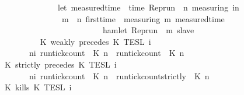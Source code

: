 \begin{isabellebody}
\ \ \ \ \ \ \ \ \ \ \ \ \ \ \ \ \ {\isacharparenleft}let\ measured{\isacharunderscore}time\ {\isacharequal}\ time\ {\isacharparenleft}{\isacharparenleft}Rep{\isacharunderscore}run\ {\isasymrho}{\isacharparenright}\ n\ measuring{\isacharparenright}\ in\isanewline
\ \ \ \ \ \ \ \ \ \ \ \ \ \ \ \ \ \ {\isasymforall}m\ {\isasymge}\ n{\isachardot}\ first{\isacharunderscore}time\ {\isasymrho}\ measuring\ m\ {\isacharparenleft}measured{\isacharunderscore}time\ {\isacharplus}\ {\isasymdelta}{\isasymtau}{\isacharparenright}\isanewline
\ \ \ \ \ \ \ \ \ \ \ \ \ \ \ \ \ \ \ \ \ \ \ \ \ \ \ {\isasymlongrightarrow}\ hamlet\ {\isacharparenleft}{\isacharparenleft}Rep{\isacharunderscore}run\ {\isasymrho}{\isacharparenright}\ m\ slave{\isacharparenright}\isanewline
\ \ \ \ \ \ \ \ \ \ \ \ \ \ \ \ \ {\isacharparenright}\isanewline
\ \ \ \ \ \ \ \ {\isacharbraceright}{\isacartoucheclose}\isanewline
\ \ {\isacharbar}\ {\isacartoucheopen}{\isasymlbrakk}\ K\ weakly\ precedes\ K\ {\isasymrbrakk}\isactrlsub T\isactrlsub E\isactrlsub S\isactrlsub L\isactrlbsup {\isasymge}\ i\isactrlesup \ {\isacharequal}\isanewline
\ \ \ \ \ \ \ \ {\isacharbraceleft}\ {\isasymrho}{\isachardot}\ {\isasymforall}n{\isasymge}i{\isachardot}\ {\isacharparenleft}run{\isacharunderscore}tick{\isacharunderscore}count\ {\isasymrho}\ K\ n{\isacharparenright}\ {\isasymle}\ {\isacharparenleft}run{\isacharunderscore}tick{\isacharunderscore}count\ {\isasymrho}\ K\ n{\isacharparenright}\ {\isacharbraceright}{\isacartoucheclose}\isanewline
\ \ {\isacharbar}\ {\isacartoucheopen}{\isasymlbrakk}\ K\ strictly\ precedes\ K\ {\isasymrbrakk}\isactrlsub T\isactrlsub E\isactrlsub S\isactrlsub L\isactrlbsup {\isasymge}\ i\isactrlesup \ {\isacharequal}\isanewline
\ \ \ \ \ \ \ \ {\isacharbraceleft}\ {\isasymrho}{\isachardot}\ {\isasymforall}n{\isasymge}i{\isachardot}\ {\isacharparenleft}run{\isacharunderscore}tick{\isacharunderscore}count\ {\isasymrho}\ K\ n{\isacharparenright}\ {\isasymle}\ {\isacharparenleft}run{\isacharunderscore}tick{\isacharunderscore}count{\isacharunderscore}strictly\ {\isasymrho}\ K\ n{\isacharparenright}\ {\isacharbraceright}{\isacartoucheclose}\isanewline
\ \ {\isacharbar}\ {\isacartoucheopen}{\isasymlbrakk}\ K\ kills\ K\ {\isasymrbrakk}\isactrlsub T\isactrlsub E\isactrlsub S\isactrlsub L\isactrlbsup {\isasymge}\ i\isactrlesup \ {\isacharequal}\isanewline

\end{isabellebody}

